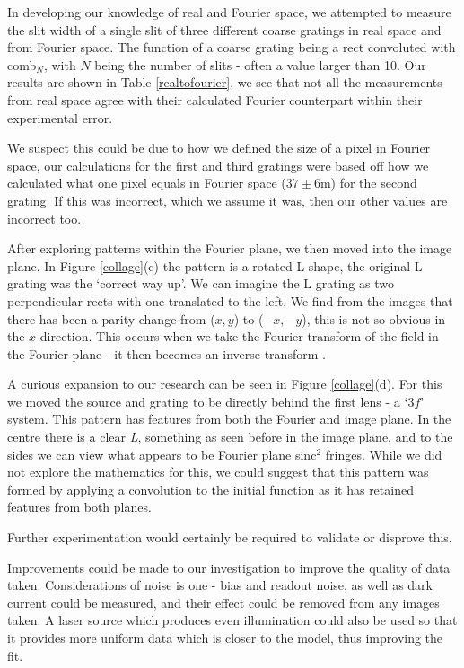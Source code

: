 \documentclass[twocolumn]{revtex4}
\begin{document}
In developing our knowledge of real and Fourier space, we attempted to measure the slit width of a single slit of three different coarse gratings in real space and from Fourier space. The function of a coarse grating being a rect convoluted with comb$_N$, with $N$ being the number of slits - often a value larger than 10. Our results are shown in Table \ref{realtofourier}, we see that not all the measurements from real space agree with their calculated Fourier counterpart within their experimental error.

We suspect this could be due to how we defined the size of a pixel in Fourier space, our calculations for the first and third gratings were based off how we calculated what one pixel equals in Fourier space ($37\pm6$m) for the second grating. If this was incorrect, which we assume it was, then our other values are incorrect too.

After exploring patterns within the Fourier plane, we then moved into the image plane. In Figure \ref{collage}(c) the pattern is a rotated L shape, the original L grating was the `correct way up'. We can imagine the L grating as two perpendicular rects with one translated to the left. We find from the images that there has been a parity change from ($x,y$) to ($-x,-y$), this is not so obvious in the $x$ direction. This occurs when we take the Fourier transform of the field in the Fourier plane - it then becomes an inverse transform \cite{of2f}. 

A curious expansion to our research can be seen in Figure \ref{collage}(d). For this we moved the source and grating to be directly behind the first lens - a `$3f$' system. This pattern has features from both the Fourier and image plane. In the centre there is a clear \textit{L}, something as seen before in the image plane, and to the sides we can view what appears to be Fourier plane sinc$^2$ fringes. While we did not explore the mathematics for this, we could suggest that this pattern was formed by applying a convolution to the initial function as it has retained features from both planes.

Further experimentation would certainly be required to validate or disprove this.

Improvements could be made to our investigation to improve the quality of data taken. Considerations of noise is one - bias and readout noise, as well as dark current could be measured, and their effect could be removed from any images taken. A laser source which produces even illumination could also be used so that it provides more uniform data which is closer to the model, thus improving the fit.
\end{document}
